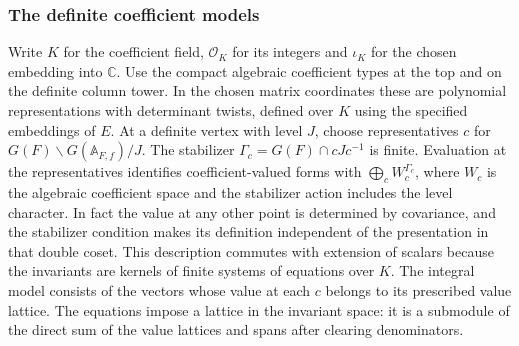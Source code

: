 \subsubsection{The definite coefficient models}
Write \(K\) for the coefficient field, \(\mathcal O_K\) for its
integers and \(\iota_K\) for the chosen embedding into \(\mathbb C\).
Use the compact algebraic coefficient types at the top and on the
definite column tower. In the chosen matrix coordinates these are
polynomial representations with determinant twists, defined over \(K\)
using the specified embeddings of \(E\). At a definite vertex with
level \(J\), choose representatives \(c\) for
\(G(F)\backslash G(\mathbb A_{F,f})/J\). The stabilizer
\(\Gamma_c=G(F)\cap cJc^{-1}\) is finite. Evaluation at the representatives
identifies coefficient-valued forms with
\(\bigoplus_c W_c^{\Gamma_c}\), where \(W_c\) is the algebraic
coefficient space and the stabilizer action includes the level
character. In fact the value at any other point is determined by
covariance, and the stabilizer condition makes its definition
independent of the presentation in that double coset.
This description commutes with extension of scalars because the
invariants are kernels of finite systems of equations over \(K\).
The integral model consists of the vectors whose value at each \(c\)
belongs to its prescribed value lattice. The equations impose a
lattice in the invariant space: it is a submodule of the direct
sum of the value lattices and spans after clearing denominators.

